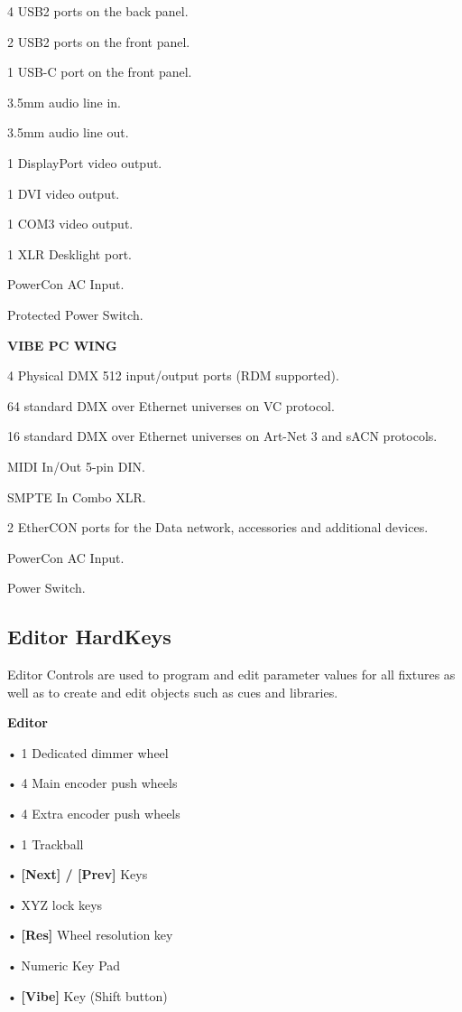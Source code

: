 \documentclass[
]{article}
\begin{document}
4 USB2 ports on the back panel.

2 USB2 ports on the front panel.

1 USB-C port on the front panel.

3.5mm audio line in.

3.5mm audio line out.

1 DisplayPort video output.

1 DVI video output.

1 COM3 video output.

1 XLR Desklight port.

PowerCon AC Input.

Protected Power Switch.

\textbf{VIBE PC WING}

4 Physical DMX 512 input/output ports (RDM supported).

64 standard DMX over Ethernet universes on VC protocol.

16 standard DMX over Ethernet universes on Art-Net 3 and sACN protocols.

MIDI In/Out 5-pin DIN.

SMPTE In Combo XLR.

2 EtherCON ports for the Data network, accessories and additional devices.

PowerCon AC Input.

Power Switch.

\hypertarget{Editor-HardKeys-2.4}{%
\subsection{Editor HardKeys}\label{Editor-HardKeys-2.4}}

Editor Controls are used to program and edit parameter values for all fixtures as well as to create and edit objects such as cues and libraries.

\textbf{Editor}

• 1 Dedicated dimmer wheel

• 4 Main encoder push wheels

• 4 Extra encoder push wheels

• 1 Trackball

• \textbf{{[}Next{]} / {[}Prev{]}} Keys

• XYZ lock keys

• \textbf{{[}Res{]}} Wheel resolution key

• Numeric Key Pad

• \textbf{{[}Vibe{]}} Key (Shift button)
\end{document}
